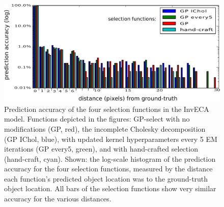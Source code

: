 \begin{figure}[ht!]%
\centering
\includegraphics[width=\textwidth]{inveca/locationHist_js.pdf}%
\caption{Prediction accuracy of the four selection functions in the InvECA model.
Functions depicted in the figures: GP-select with no modifications (GP, red), the incomplete Cholesky decomposition (GP IChol, blue), with updated kernel hyperparameters every 5 EM iterations (GP every5, green), and with hand-crafted selection (hand-craft, cyan).
Shown: the log-scale histogram of the prediction accuracy for the four selection functions, measured by the distance each function's predicted object location was to the ground-truth object location. 
All bars of the selection functions show very similar accuracy for the various distances. 
}
\label{fig:inveca1}
\end{figure}
%
